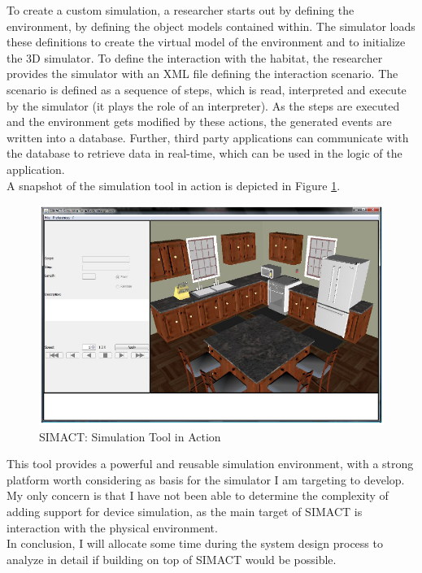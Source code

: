 To create a custom simulation, a researcher starts out by defining the environment, by defining the object models contained within. The simulator loads these definitions to create the virtual model of the environment and to initialize the 3D simulator. To define the interaction with the habitat, the researcher provides the simulator with an XML file defining the interaction scenario. The scenario is defined as a sequence of steps, which is read, interpreted and execute by the simulator (it plays the role of an interpreter). As the steps are executed and the environment gets modified by these actions, the generated events are written into a database. Further, third party applications can communicate with the database to retrieve data in real-time, which can be used in the logic of the application.\\

A snapshot of the simulation tool in action is depicted in Figure \ref{fig:simact_simulation_tool}.

\begin{figure}[H]
	\centering
	\includegraphics[width=\linewidth]{gfx/Chapter2/simact_simulation_tool}
	\caption{SIMACT: Simulation Tool in Action}
	\label{fig:simact_simulation_tool}
\end{figure}

This tool provides a powerful and reusable simulation environment, with a strong platform worth considering as basis for the simulator I am targeting to develop. My only concern is that I have not been able to determine the complexity of adding support for device simulation, as the main target of SIMACT is interaction with the physical environment.\\

In conclusion, I will allocate some time during the system design process to analyze in detail if building on top of SIMACT would be possible.
